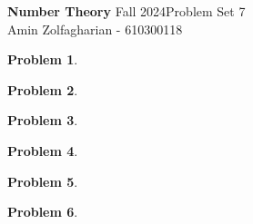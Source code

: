 \documentclass[12pt]{article}
\newcommand{\customanswer}[1]{%
\begin{problem}
\end{problem}

}
\newtheorem{problem}{Problem}
\begin{document}
\noindent \textbf{Number Theory} Fall 2024\hfill Problem Set 7\\
Amin Zolfagharian - 610300118

\hrulefill

\customanswer{1}
\newpage
\customanswer{2}
\customanswer{3}
\customanswer{4}
\customanswer{5}
\customanswer{6}
\end{document}

